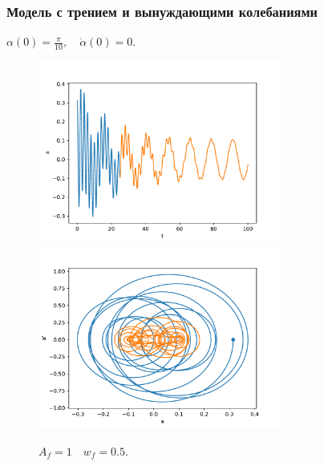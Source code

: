         \subsubsection{Модель с трением и вынуждающими колебаниями}
            $\alpha(0) = \frac{\pi}{10}, \quad \dot{\alpha}(0) = 0$.
            \begin{figure}[H]
                \centering
                \includegraphics[width=8cm]{pictures/5resonance1.pdf}
                \includegraphics[width=8cm]{pictures/5resonance1p.pdf}
                \caption{$A_f = 1 \quad w_f = 0.5$.}
            \end{figure}


